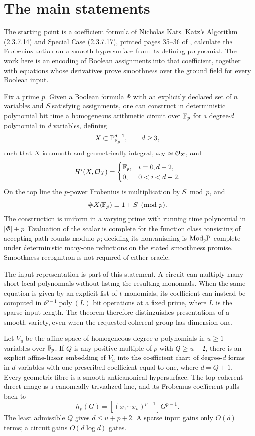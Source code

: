 \section{The main statements}
The starting point is a coefficient formula of Nicholas Katz. Katz's Algorithm (2.3.7.14) and Special Case (2.3.7.17), printed pages 35--36 of \citet{core-katz}, calculate the Frobenius action on a smooth hypersurface from its defining polynomial. The work here is an encoding of Boolean assignments into that coefficient, together with equations whose derivatives prove smoothness over the ground field for every Boolean input.

\begin{theorem}\label{thm:main}
Fix a prime $p$. Given a Boolean formula $\Phi$ with an explicitly declared set of $n$ variables and $S$ satisfying assignments, one can construct in deterministic polynomial bit time a homogeneous arithmetic circuit over $\mathbb F_p$ for a degree-$d$ polynomial in $d$ variables, defining
\[
X\subset\mathbb P^{d-1}_{\mathbb F_p},\qquad d\ge3,
\]
such that $X$ is smooth and geometrically integral, $\omega_X\simeq\mathcal O_X$, and
\[
H^i(X,\mathcal O_X)=
\begin{cases}\mathbb F_p,&i=0,d-2,\\0,&0<i<d-2.\end{cases}
\]
On the top line the $p$-power Frobenius is multiplication by $S\bmod p$, and
\[
\#X(\mathbb F_p)\equiv1+S\pmod p.
\]
The construction is uniform in a varying prime with running time polynomial in $|\Phi|+p$. Evaluation of the scalar is complete for the function class consisting of accepting-path counts modulo $p$; deciding its nonvanishing is $\mathrm{Mod}_p\mathrm P$-complete under deterministic many-one reductions on the stated smoothness promise. Smoothness recognition is not required of either oracle.
\end{theorem}

The input representation is part of this statement. A circuit can multiply many short local polynomials without listing the resulting monomials. When the same equation is given by an explicit list of $t$ monomials, its coefficient can instead be computed in $t^{p-1}\operatorname{poly}(L)$ bit operations at a fixed prime, where $L$ is the sparse input length. The theorem therefore distinguishes presentations of a smooth variety, even when the requested coherent group has dimension one.

\begin{theorem}\label{thm:stabilization-intro}
Let $V_u$ be the affine space of homogeneous degree-$u$ polynomials in $u\ge1$ variables over $\mathbb F_p$. If $Q$ is any positive multiple of $p$ with $Q\ge u+2$, there is an explicit affine-linear embedding of $V_u$ into the coefficient chart of degree-$d$ forms in $d$ variables with one prescribed coefficient equal to one, where $d=Q+1$. Every geometric fibre is a smooth anticanonical hypersurface. The top coherent direct image is a canonically trivialized line, and its Frobenius coefficient pulls back to
\[
h_p(G)=[(x_1\cdots x_u)^{p-1}]G^{p-1}.
\]
The least admissible $Q$ gives $d\le u+p+2$. A sparse input gains only $O(d)$ terms; a circuit gains $O(d\log d)$ gates.
\end{theorem}

